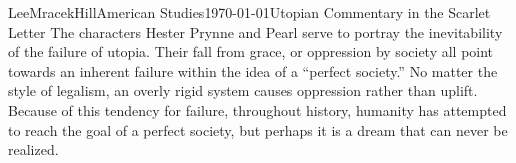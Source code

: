 \documentclass[12pt, letterpaper]{article}
\begin{document}
\begin{mla}{Lee}{Mracek}{Hill}{American Studies}{\today}{Utopian Commentary in the Scarlet Letter}
        The characters Hester Prynne and Pearl serve to portray the inevitability of the failure of utopia. Their fall from grace, or oppression by society all point towards an inherent failure within the idea of a ``perfect society.'' No matter the style of legalism, an overly rigid system causes oppression rather than uplift. Because of this tendency for failure, throughout history, humanity has attempted to reach the goal of a perfect society, but perhaps it is a dream that can never be realized.
\end{mla}
\end{document}
